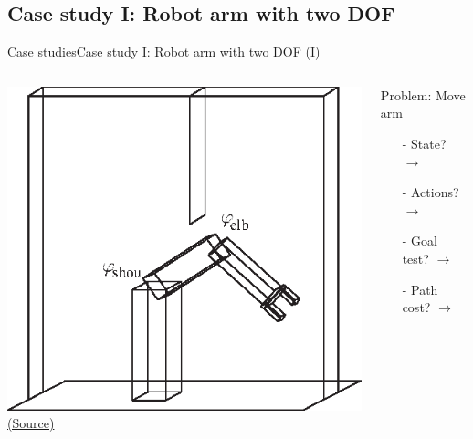 \documentclass[10pt,compress]{beamer} %
\begin{document}
\subsection{Case study I: Robot arm with two DOF}
\begin{frame}{Case studies}{Case study I: Robot arm with two DOF (I)}
       \begin{columns}
	            \centering \includegraphics[width=\linewidth]{figs/armPlain.eps}\\
	            \tiny{\href{http://aima.cs.berkeley.edu/index.html}{(Source)}}
                \begin{exampleblock}{Problem: Move arm}
                    \begin{itemize}
                    \item[-] State? $\rightarrow$ 
                    \item[-] Actions? $\rightarrow$ 
                    \item[-] Goal test? $\rightarrow$ 
                    \item[-] Path cost? $\rightarrow$
                    \end{itemize}
                \end{exampleblock}
      \end{columns}
\end{frame}
\end{document}
